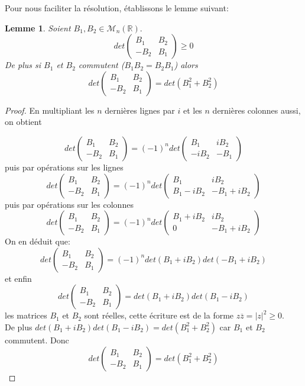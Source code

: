 \documentclass[12pt,a4paper,openany,oneside]{book}
\newtheorem{lemma}{Lemme}[chapter]
\begin{document}
{{{{{{Pour nous faciliter la résolution, établissons le lemme suivant:
\begin{lemma}\label{lemmedeterminant}
Soient $ B_{1}, B_{2} \in \mathcal{M}_{n}(\mathbb{R}).$\\
$$ det\begin{pmatrix}
B_{1}& B_{2}\\
-B_{2} & B_{1}
\end{pmatrix}\geq 0
$$
De plus si $B_{1}$ et $B_{2}$ commutent ($B_{1}B_{2}=B_{2}B_{1}$) alors 
$$ det\begin{pmatrix}
B_{1}& B_{2}\\
-B_{2} & B_{1}
\end{pmatrix}=det(B_{1}^{2}+B_{2}^{2})$$
\end{lemma}
\begin{proof}
En multipliant les $n$ dernières lignes par $i$ et les $n$ dernières colonnes aussi, on obtient 

$$ det\begin{pmatrix}
B_{1}& B_{2}\\
-B_{2} & B_{1}
\end{pmatrix}=(-1)^{n}det\begin{pmatrix}
B_{1} & iB_{2}\\
-iB_{2} & -B_{1}
\end{pmatrix}
$$
puis par opérations sur les lignes
$$ det\begin{pmatrix}
B_{1}& B_{2}\\
-B_{2} & B_{1}
\end{pmatrix}= (-1)^{n}det\begin{pmatrix}
B_{1} & iB_{2}\\
B_{1}-iB_{2} & -B_{1}+iB_{2}
\end{pmatrix}
$$
puis par opérations sur les colonnes
$$ det\begin{pmatrix}
B_{1}& B_{2}\\
-B_{2} & B_{1}
\end{pmatrix}= (-1)^{n}det\begin{pmatrix}
B_{1}+iB_{2} & iB_{2}\\
0 & -B_{1}+iB_{2}
\end{pmatrix}
$$
On en déduit que:
$$ det\begin{pmatrix}
B_{1}& B_{2}\\
-B_{2} & B_{1}
\end{pmatrix}= (-1)^{n}det(B_{1}+iB_{2})det(-B_{1}+iB_{2})
$$
et enfin 
$$ det\begin{pmatrix}
B_{1}& B_{2}\\
-B_{2} & B_{1}
\end{pmatrix}= det(B_{1}+iB_{2})det(B_{1}-iB_{2})
$$
les matrices $B_{1}$ et $B_{2}$  sont réelles, cette écriture est de la forme $z\overline{z} = \vert z\vert^{2}\geq 0$.\\
De plus $ det(B_{1}+iB_{2})det(B_{1}-iB_{2})= det(B_{1}^{2}+B_{2}^{2}) $ car $B_{1}$ et $B_{2}$  commutent. Donc 
$$ det\begin{pmatrix}
B_{1}& B_{2}\\
-B_{2} & B_{1}
\end{pmatrix}=det(B_{1}^{2}+B_{2}^{2})$$


\end{proof}}}}}}}
\end{document}
